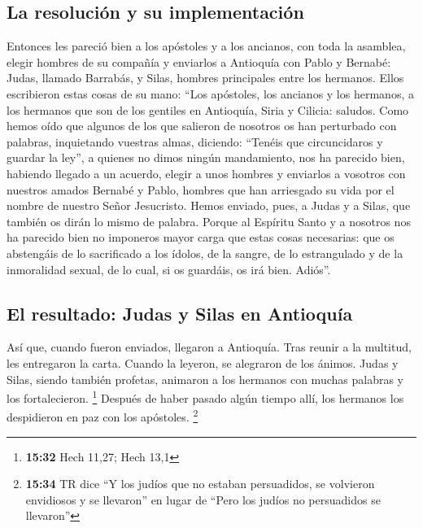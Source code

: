 \begin{paracol}{2}
{\subsection{La resolución y su
implementación}\label{la-resoluciuxf3n-y-su-implementaciuxf3n}}

 Entonces les pareció bien a los apóstoles y a los
ancianos, con toda la asamblea, elegir hombres de su compañía y
enviarlos a Antioquía con Pablo y Bernabé: Judas, llamado Barrabás, y
Silas, hombres principales entre los hermanos.  Ellos
escribieron estas cosas de su mano: ``Los apóstoles, los ancianos y los
hermanos, a los hermanos que son de los gentiles en Antioquía, Siria y
Cilicia: saludos.  Como hemos oído que algunos de los que
salieron de nosotros os han perturbado con palabras, inquietando
vuestras almas, diciendo: ``Tenéis que circuncidaros y guardar la ley'',
a quienes no dimos ningún mandamiento,  nos ha parecido
bien, habiendo llegado a un acuerdo, elegir a unos hombres y enviarlos a
vosotros con nuestros amados Bernabé y Pablo,  hombres
que han arriesgado su vida por el nombre de nuestro Señor Jesucristo.
 Hemos enviado, pues, a Judas y a Silas, que también os
dirán lo mismo de palabra.  Porque al Espíritu Santo y a
nosotros nos ha parecido bien no imponeros mayor carga que estas cosas
necesarias:  que os abstengáis de lo sacrificado a los
ídolos, de la sangre, de lo estrangulado y de la inmoralidad sexual, de
lo cual, si os guardáis, os irá bien. Adiós''.

\hypertarget{el-resultado-judas-y-silas-en-antioquuxeda}{%
\subsection{El resultado: Judas y Silas en
Antioquía}\label{el-resultado-judas-y-silas-en-antioquuxeda}}

 Así que, cuando fueron enviados, llegaron a Antioquía.
Tras reunir a la multitud, les entregaron la carta. 
Cuando la leyeron, se alegraron de los ánimos.  Judas y
Silas, siendo también profetas, animaron a los hermanos con muchas
palabras y los fortalecieron. \footnote{\textbf{15:32} Hech 11,27; Hech
  13,1}  Después de haber pasado algún tiempo allí, los
hermanos los despidieron en paz con los apóstoles. 
\footnote{\textbf{15:34} TR dice ``Y los judíos que no estaban
  persuadidos, se volvieron envidiosos y se llevaron'' en lugar de
  ``Pero los judíos no persuadidos se llevaron''}


\end{paracol}
